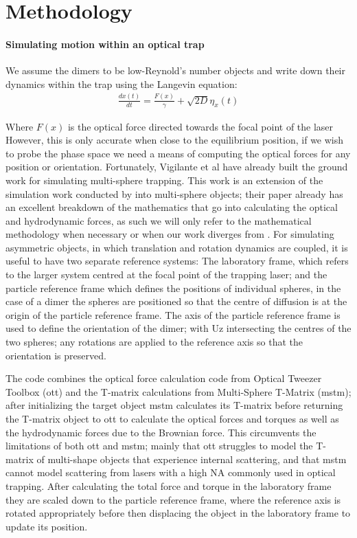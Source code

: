 \documentclass[preprint,  3p]{elsarticle}
\begin{document}
\newpage
 


\section{Methodology}
\paragraph{Simulating motion within an optical trap}
We assume the dimers to be low-Reynold’s number objects and write down their dynamics within the trap using the Langevin equation:
\begin{align}
	\label{eq:langevin}
	\frac{dx(t)}{dt}=\frac{F(x)}{\gamma}+\sqrt{2D}\eta_x(t)
\end{align}

Where $F(x)$ is the optical force directed towards the focal point of the laser However, this is only accurate when close to the equilibrium position, if we wish to probe the phase space we need a means of computing the optical forces for any position or orientation. Fortunately, Vigilante et al \cite{Vigilante_2020} have already built the ground work for simulating multi-sphere trapping. This work is an extension of the simulation work conducted by \cite{Vigilante_2020} into multi-sphere objects; their paper already has an excellent breakdown of the mathematics that go into calculating the optical and hydrodynamic forces, as such we will only refer to the mathematical methodology when necessary or when our work diverges from \cite{Vigilante_2020}. For simulating asymmetric objects, in which translation and rotation dynamics are coupled, it is useful to have two separate reference systems: The laboratory frame, which refers to the larger system centred at the focal point of the trapping laser; and the particle reference frame which defines the positions of individual spheres, in the case of a dimer the spheres are positioned so that the centre of diffusion is at the origin of the particle reference frame. The axis of the particle reference frame is used to define the orientation of the dimer; with Uz intersecting the centres of the two spheres; any rotations are applied to the reference axis so that the orientation is preserved.

The code combines the optical force calculation code from Optical Tweezer Toolbox (ott) and the T-matrix calculations from Multi-Sphere T-Matrix (mstm); after initializing the target object mstm calculates its T-matrix before returning the T-matrix object to ott to calculate the optical forces and torques as well as the hydrodynamic forces due to the Brownian force. This circumvents the limitations of both ott and mstm; mainly that ott struggles to model the T-matrix of multi-shape objects that experience internal scattering, and that mstm cannot model scattering from lasers with a high NA commonly used in optical trapping. After calculating the total force and torque in the laboratory frame they are scaled down to the particle reference frame, where the reference axis is rotated appropriately before then displacing the object in the laboratory frame to update its position.  
\end{document}
